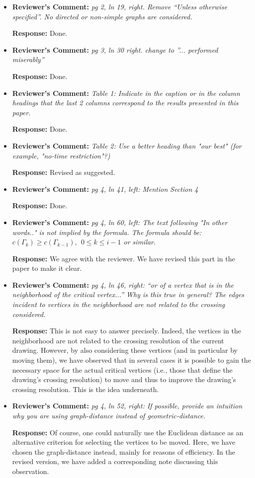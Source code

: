 \documentclass{article}
\newcommand{\rcomment}[1]{\vspace{0.3cm} \item \textbf{Reviewer's Comment:} {\em #1}}
\newcommand{\response}{\vspace{0.2cm} \textbf{Response: }}
\begin{document}
\begin{itemize}
\rcomment{pg 2, ln 19, right. Remove ``Unless otherwise specified''. No directed or non-simple graphs are considered.}

\response{Done.}

\rcomment{pg 3, ln 30 right. change to ''... performed miserably''}

\response{Done.}

\rcomment{Table 1: Indicate in the caption or in the column headings that the last 2 columns correspond to the results presented in this paper.}

\response{Done.}

\rcomment{Table 2: Use a better heading than "our best" (for example, "no-time restriction"?)}

\response{Revised as suggested.}

\rcomment{pg 4, ln 41, left: Mention Section 4}

\response{Done.}

\rcomment{pg 4, ln 60, left: The text following "In other words.." is not implied by the formula. The formula should be: $c(\Gamma_{k}) \geq c(\Gamma_{k-1}), ~~0 \leq k \leq i-1$ or similar.}

\response{We agree with the reviewer. We have revised this part in the paper to make it clear.}

\rcomment{pg 4, ln 46, right: ``or of a vertex that is in the neighborhood of the critical vertex...'' Why is this true in general? The edges incident to vertices in the neighborhood are not related to the crossing considered.}

\response{This is not easy to answer precisely. Indeed, the vertices in the neighborhood are not related to the crossing resolution of the current drawing. However, by also considering these vertices (and in particular by moving them), we have observed that in several cases it is possible to gain the necessary space for the actual critical vertices (i.e., those that define the drawing's crossing resolution) to move and thus to improve the drawing's crossing resolution. This is the idea underneath.}

\rcomment{pg 4, ln 52, right: If possible, provide an intuition why you are using graph-distance instead of geometric-distance.}

\response{Of course, one could naturally use the Euclidean distance as an alternative criterion for selecting the vertices to be moved. Here, we have chosen the graph-distance instead, mainly for reasons of efficiency. In the revised version, we have added a corresponding note discussing this observation.}


\end{itemize}
\end{document}
